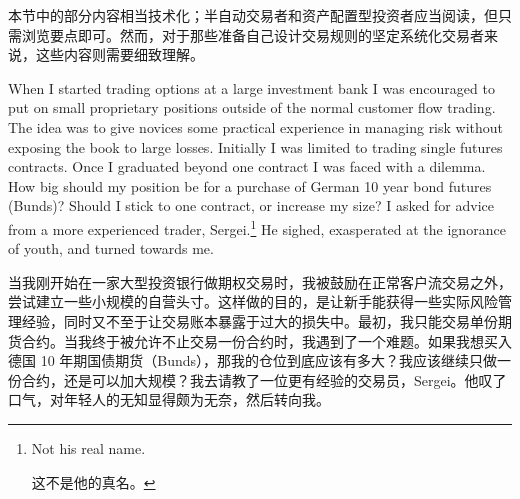 \begin{chineseblock}本节中的部分内容相当技术化；半自动交易者和资产配置型投资者应当阅读，但只需浏览要点即可。然而，对于那些准备自己设计交易规则的坚定系统化交易者来说，这些内容则需要细致理解。\end{chineseblock}


\begin{englishblock} When I started trading options at a large investment bank I was encouraged to put on small proprietary positions outside of the normal customer flow trading. The idea was to give novices some practical experience in managing risk without exposing the book to large losses. Initially I was limited to trading single futures contracts. Once I graduated beyond one contract I was faced with a dilemma. How big should my position be for a purchase of German 10 year bond futures (Bunds)? Should I stick to one contract, or increase my size? I asked for advice from a more experienced trader, Sergei.\footnote{Not his real name. \par 这不是他的真名。} He sighed, exasperated at the ignorance of youth, and turned towards me. \end{englishblock}

\begin{chineseblock}当我刚开始在一家大型投资银行做期权交易时，我被鼓励在正常客户流交易之外，尝试建立一些小规模的自营头寸。这样做的目的，是让新手能获得一些实际风险管理经验，同时又不至于让交易账本暴露于过大的损失中。最初，我只能交易单份期货合约。当我终于被允许不止交易一份合约时，我遇到了一个难题。如果我想买入德国 10 年期国债期货（Bunds），那我的仓位到底应该有多大？我应该继续只做一份合约，还是可以加大规模？我去请教了一位更有经验的交易员，Sergei。他叹了口气，对年轻人的无知显得颇为无奈，然后转向我。\end{chineseblock}

\bipairgap

